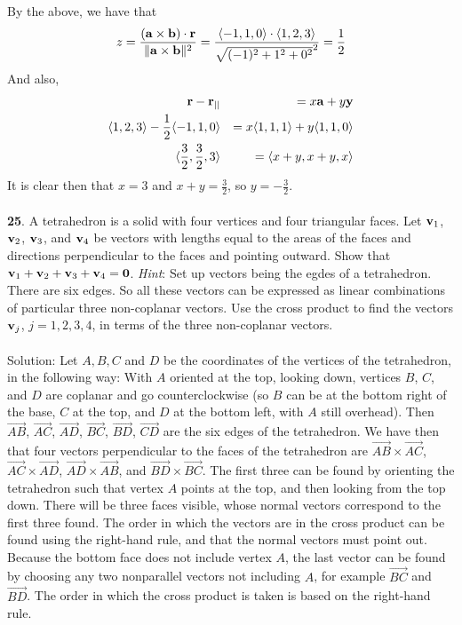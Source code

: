 \documentclass[12pt]{amsbook}
\newcommand{\la}{\langle}
\newcommand{\ra}{\rangle}
\begin{document}
By the above, we have that 
$$z=\frac{({\bf a}\times{\bf b})\cdot{\bf r}}{\|{\bf a}\times{\bf b}\|^2}=\frac{\la -1,1,0\ra \cdot \la 1,2,3 \ra}{\sqrt{(-1)^2+1^2+0^2}^2}=\frac{1}{2}$$
And also,
\begin{eqnarray*}
{\bf r}-{\bf r}_{||}&&=x{\bf a}+y{\bf y} \\
\la 1,2,3 \ra -\frac 12 \la -1,1,0 \ra &&= x\la 1,1,1 \ra + y\la 1,1,0 \ra \\
\la \frac 32,\frac 32,3 \ra &&= \la x+y,x+y,x \ra 
\end{eqnarray*}
It is clear then that $x=3$ and $x+y=\frac 32$, so $y=-\frac 32$.
\\
\\
{\small\bf 25}. A tetrahedron is a solid with four vertices and four
triangular faces. Let ${\bf v}_1$, ${\bf v}_2$, ${\bf v}_3$, and
${\bf v}_4$ be vectors with lengths equal to the areas of the
faces and directions perpendicular to the faces and pointing
outward. Show that ${\bf v}_1+{\bf v}_2+{\bf v}_3+{\bf v}_4={\bf
0}$. {\it Hint}: Set up vectors being the egdes of a tetrahedron.
There are six edges. So all these vectors can be expressed as linear
combinations of particular three non-coplanar vectors. Use the cross
product to find the vectors ${\bf v}_j$, $j=1,2,3,4$, in terms of the three
non-coplanar vectors.\\
\\
{\sc Solution}:
Let $A,B,C$ and $D$ be the coordinates of the vertices of the tetrahedron, in the following way: With $A$ oriented at the top, looking down, vertices $B$, $C$, and $D$ are coplanar and go counterclockwise (so $B$ can be at the bottom right of the base, $C$ at the top, and $D$ at the bottom left, with $A$ still overhead). Then $\overrightarrow{AB}$, $\overrightarrow{AC}$, $\overrightarrow{AD}$, $\overrightarrow{BC}$, $\overrightarrow{BD}$, $\overrightarrow{CD}$ are the six edges of the tetrahedron. We have then that four vectors perpendicular to the faces of the tetrahedron are $\overrightarrow{AB}\times\overrightarrow{AC}$, $\overrightarrow{AC}\times\overrightarrow{AD}$, $\overrightarrow{AD}\times\overrightarrow{AB}$, and $\overrightarrow{BD}\times\overrightarrow{BC}$. The first three can be found by orienting the tetrahedron such that vertex $A$ points at the top, and then looking from the top down. There will be three faces visible, whose normal vectors correspond to the first three found. The order in which the vectors are in the cross product can be found using the right-hand rule, and that the normal vectors must point out. Because the bottom face does not include vertex $A$, the last vector can be found by choosing any two nonparallel vectors not including $A$, for example $\overrightarrow{BC}$ and $\overrightarrow{BD}$. The order in which the cross product is taken is based on the right-hand rule. 
\end{document}
